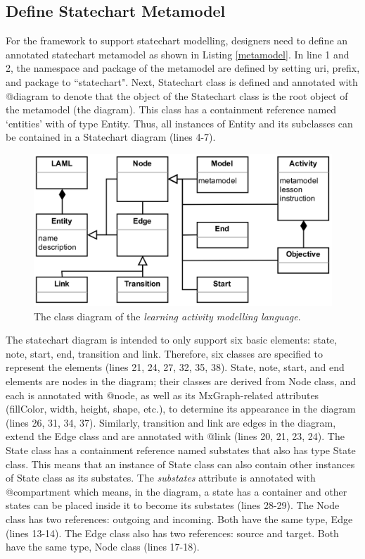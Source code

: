 \documentclass[conference]{IEEEtran}
\begin{document}
\subsection{Define Statechart Metamodel}
For the framework to support statechart modelling, designers need to define an annotated statechart metamodel as shown in Listing \ref{metamodel}. In line 1 and 2, the namespace and package of the metamodel are defined by setting uri, prefix, and package to ``statechart". Next, Statechart class is defined and annotated with {\selectfont @diagram} to denote that the object of the Statechart class is the root object of the metamodel (the diagram). This class has a containment reference named `entities' with of type Entity. Thus, all instances of Entity and its subclasses can be contained in a Statechart diagram (lines 4-7).  

\begin{figure}[t!]
\centering
\includegraphics[width=\linewidth]{laml}
\caption{The class diagram of the \emph{learning activity modelling language}.}
\label{laml}
\end{figure}

The statechart diagram is intended to only support six basic elements: state, note, start, end, transition and link. Therefore, six classes are specified to represent the elements (lines 21, 24, 27, 32, 35, 38). State, note, start, and end elements are nodes in the diagram; their classes are derived from Node class, and each is annotated with {\selectfont @node}, as well as its MxGraph-related attributes (fillColor, width, height, shape, etc.), to determine its appearance in the diagram (lines 26, 31, 34, 37). Similarly, transition and link are edges in the diagram, extend the Edge class and are annotated with {\selectfont @link} (lines 20, 21, 23, 24). The State class has a containment reference named substates that also has type State class. This means that an instance of State class can also contain other instances of State class as its substates. The \emph{substates} attribute is annotated with {\selectfont @compartment} which means, in the diagram, a state has a container and other states can be placed inside it to become its substates (lines 28-29). The Node class has two references: outgoing and incoming. Both have the same type, Edge (lines 13-14). The Edge class also has two references: source and target. Both have the same type, Node class (lines 17-18).
\end{document}
